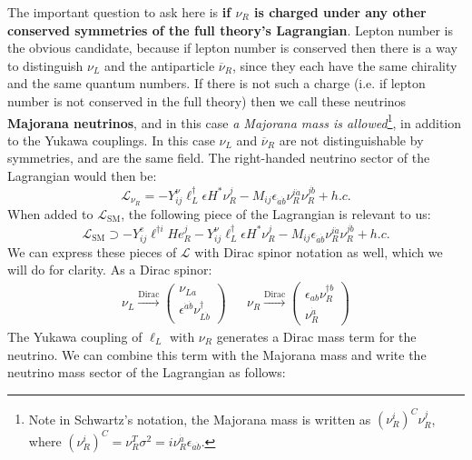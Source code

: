 \documentclass[11pt, oneside]{article}   	%
\theoremstyle{definition}
\numberwithin{equation}{subsection}		%
\begin{document}
The important question to ask here is \textbf{if $\nu_R$ is charged under any other conserved symmetries of the full theory's Lagrangian}. 
Lepton number is the obvious candidate, because if lepton number is conserved then there is a way to distinguish $\nu_L$ and 
the antiparticle $\overline\nu_R$, since they each have the same chirality and the same quantum numbers. 
If there is not such a charge (i.e. if lepton number is not conserved in the full theory) then we call these neutrinos 
\textbf{Majorana neutrinos}, and in this case \textit{a Majorana mass is allowed}\footnote{Note in Schwartz's notation, the Majorana mass is written as $(\nu_R^i)^C\nu_R^j$, where $(\nu_R^i)^C = \nu_R^T\sigma^2 = i\nu_R^{\dot a}\epsilon_{\dot a\dot b}$.}, in addition to the Yukawa couplings. 
In this case $\nu_L$ and $\overline\nu_R$ are not distinguishable by symmetries, and are the same field. 
The right-handed neutrino sector of the Lagrangian would then be:
\begin{equation}
	\mathcal{L}_{\nu_R} = -Y_{ij}^\nu \ell_L^\dagger \epsilon H^* \nu_R^j - M_{ij} \epsilon_{\dot a\dot b}\nu_R^{i\dot a} \nu_R^{j\dot b} + h.c.
\end{equation}
When added to $\mathcal{L}_\mathrm{SM}$, the following piece of the Lagrangian is relevant to us:
\begin{equation}
	\mathcal L_\mathrm{SM}\supset -Y_{ij}^e \ell^{\dagger i} H e_R^j -Y_{ij}^\nu \ell_L^\dagger \epsilon H^* \nu_R^j - M_{ij} \epsilon_{\dot 
	a\dot b}\nu_R^{i\dot a} \nu_R^{j\dot b} + h.c.
\end{equation}
We can express these pieces of $\mathcal L$ with Dirac spinor notation as well, which we will do for clarity. As a Dirac spinor:
\begin{align}
	\nu_L\xrightarrow{\mathrm{Dirac}}\begin{pmatrix} \nu_{La} \\ \epsilon^{\dot a\dot b} \nu_{L\dot b}^{\dagger} \end{pmatrix} &&
	\nu_R\xrightarrow{\mathrm{Dirac}} \begin{pmatrix} \epsilon_{ab}\nu_R^{\dagger b} \\ \nu_R^{\dot a}\end{pmatrix} 
\end{align}
The Yukawa coupling of $\ell_L$ with $\nu_R$ generates a Dirac mass term for the neutrino. We can combine this term with the Majorana 
mass and write the neutrino mass sector of the Lagrangian as follows:
\end{document}
